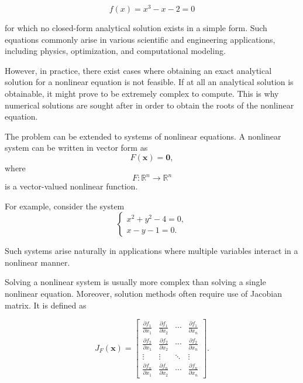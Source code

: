 \begin{equation}
f(x) = x^3 - x - 2 = 0
\end{equation}

for which no closed-form analytical solution exists in a simple form. Such equations commonly arise in various scientific and engineering applications, including physics, optimization, and computational modeling.

However, in practice, there exist cases where obtaining an exact analytical solution for a nonlinear equation is not feasible. If at all an analytical solution is obtainable, it might prove to be extremely complex to compute. This is why numerical solutions are sought after in order to obtain the roots of the nonlinear equation.

The problem can be extended to systems of nonlinear equations. 
A nonlinear system can be written in vector form as
\begin{equation}
F(\mathbf{x}) = \mathbf{0},
\end{equation}
where
\begin{equation}
F : \mathbb{R}^n \to \mathbb{R}^n
\end{equation}
is a vector-valued nonlinear function.

For example, consider the system
\begin{equation}
\begin{cases}
x^2 + y^2 - 4 = 0, \\
x - y - 1 = 0.
\end{cases}
\end{equation}

\noindent Such systems arise naturally in applications where multiple variables interact in a nonlinear manner.

Solving a nonlinear system is usually more complex than solving a single nonlinear equation. Moreover, solution methods often require use of Jacobian matrix. It is defined as

\begin{equation}
J_F(\mathbf{x}) =
\begin{bmatrix}
\frac{\partial f_1}{\partial x_1} & \frac{\partial f_1}{\partial x_2} & \cdots & \frac{\partial f_1}{\partial x_n} \\
\frac{\partial f_2}{\partial x_1} & \frac{\partial f_2}{\partial x_2} & \cdots & \frac{\partial f_2}{\partial x_n} \\
\vdots & \vdots & \ddots & \vdots \\
\frac{\partial f_n}{\partial x_1} & \frac{\partial f_n}{\partial x_2} & \cdots & \frac{\partial f_n}{\partial x_n}
\end{bmatrix}.
\end{equation}

